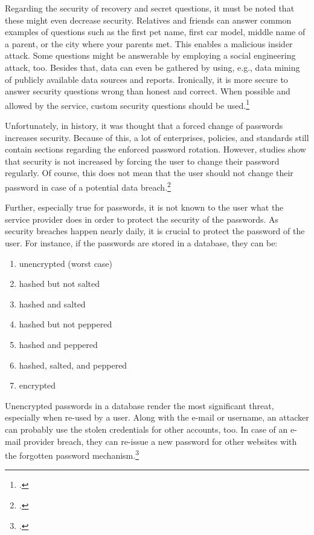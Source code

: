 Regarding the security of recovery and secret questions, it must be noted that these might even decrease security. Relatives and friends can answer common examples of questions such as \frqq the first pet name, first car model, middle name of a parent, or the city where your parents met\flqq{}. This enables a malicious insider attack. Some questions might be answerable by employing a social engineering attack, too. Besides that, data can even be gathered by using, e.g., data mining of publicly available data sources and reports. Ironically, it is more secure to answer security questions wrong than honest and correct. When possible and allowed by the service, custom security questions should be used.\footcites[See][169]{Brainard2006}[See][]{Bonneau:2015:SLA:2736277.2741691}[See][5--6]{Rabkin:2008:PKQ:1408664.1408667}[See][386]{5207657}

Unfortunately, in history, it was thought that a forced change of passwords increases security. Because of this, a lot of enterprises, policies, and standards still contain sections regarding the enforced password rotation. However, studies show that security is not increased by forcing the user to change their password regularly. Of course, this does not mean that the user should not change their password in case of a potential data breach.\footcites[See][1520]{deutschlandgrundschutz}[See][14]{SP80063B}[See][]{7676198}[See][34]{anderson2008security}

Further, especially true for passwords, it is not known to the user what the service provider does in order to protect the security of the passwords. As security breaches happen nearly daily, it is crucial to protect the password of the user. For instance, if the passwords are stored in a database, they can be:

\begin{enumerate}[label=(\alph*)]
	\item unencrypted (worst case)
	\item hashed but not salted
	\item hashed and salted
	\item hashed but not peppered
	\item hashed and peppered
	\item hashed, salted, and peppered
	\item encrypted
\end{enumerate}

Unencrypted passwords in a database render the most significant threat, especially when re-used by a user. Along with the e-mail or username, an attacker can probably use the stolen credentials for other accounts, too. In case of an e-mail provider breach, they can re-issue a new password for other websites with the \frqq forgotten password\flqq{} mechanism.\footcite[See][277]{shostack2014threat}

